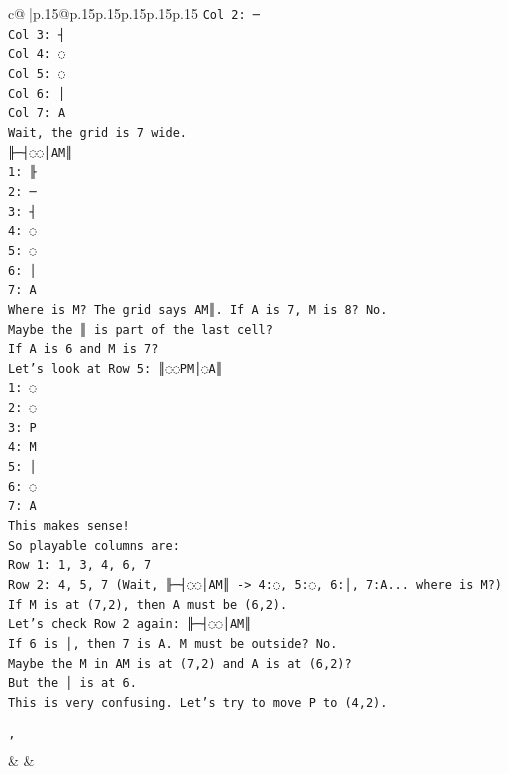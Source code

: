 \documentclass{article}
\begin{document}
{\begin{supertabular}{c@{$\;$}|p{.15\linewidth}@{}p{.15\linewidth}p{.15\linewidth}p{.15\linewidth}p{.15\linewidth}p{.15\linewidth}}
{{{\texttt{Col 2: ─} \\
\texttt{Col 3: ┤} \\
\texttt{Col 4: ◌} \\
\texttt{Col 5: ◌} \\
\texttt{Col 6: │} \\
\texttt{Col 7: A} \\
\texttt{Wait, the grid is 7 wide.} \\
\texttt{╟─┤◌◌│AM║} \\
\texttt{1: ╟} \\
\texttt{2: ─} \\
\texttt{3: ┤} \\
\texttt{4: ◌} \\
\texttt{5: ◌} \\
\texttt{6: │} \\
\texttt{7: A} \\
\texttt{Where is M? The grid says AM║. If A is 7, M is 8? No.} \\
\texttt{Maybe the ║ is part of the last cell?} \\
\texttt{If A is 6 and M is 7?} \\
\texttt{Let's look at Row 5: ║◌◌PM│◌A║} \\
\texttt{1: ◌} \\
\texttt{2: ◌} \\
\texttt{3: P} \\
\texttt{4: M} \\
\texttt{5: │} \\
\texttt{6: ◌} \\
\texttt{7: A} \\
\texttt{This makes sense!} \\
\texttt{So playable columns are:} \\
\texttt{Row 1: 1, 3, 4, 6, 7} \\
\texttt{Row 2: 4, 5, 7 (Wait, ╟─┤◌◌│AM║ {-}> 4:◌, 5:◌, 6:│, 7:A... where is M?)} \\
\texttt{If M is at (7,2), then A must be (6,2).} \\
\texttt{Let's check Row 2 again: ╟─┤◌◌│AM║} \\
\texttt{If 6 is │, then 7 is A. M must be outside? No.} \\
\texttt{Maybe the M in AM is at (7,2) and A is at (6,2)?} \\
\texttt{But the │ is at 6.} \\
\texttt{This is very confusing. Let's try to move P to (4,2).} \\
\\ 
\texttt{'} \\
            }
        }
    }
    & & \\ \\


\end{supertabular}}
\end{document}
